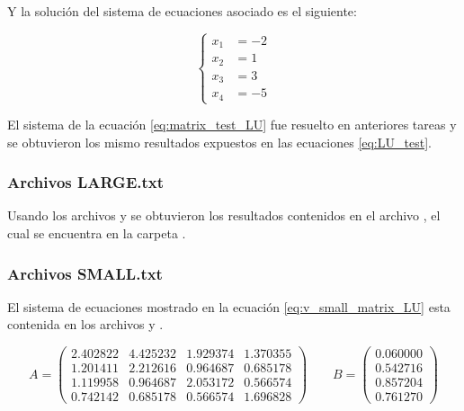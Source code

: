 Y la solución del sistema de ecuaciones asociado es el siguiente:

\begin{equation}
    \begin{cases}
        x_1 & = -2 \\
        x_2 & = 1  \\
        x_3 & = 3  \\
        x_4 & = -5
    \end{cases}
    \label{eq:LU_test}
\end{equation}

El sistema de la ecuación \ref{eq:matrix_test_LU} fue resuelto en anteriores tareas y se obtuvieron los mismo resultados expuestos en las ecuaciones \ref{eq:LU_test}.

\subsubsection{Archivos LARGE.txt}

Usando los archivos  y  se obtuvieron los resultados contenidos en el archivo , el cual se encuentra en la carpeta .

\subsubsection{Archivos SMALL.txt \label{sec:small_lu}}

El sistema de ecuaciones mostrado en la ecuación \ref{eq:v_small_matrix_LU} esta contenida en los archivos  y .

\begin{equation}
    A= \begin{pmatrix}
        2.402822 & 4.425232 & 1.929374 & 1.370355 \\
        1.201411 & 2.212616 & 0.964687 & 0.685178 \\
        1.119958 & 0.964687 & 2.053172 & 0.566574 \\
        0.742142 & 0.685178 & 0.566574 & 1.696828
    \end{pmatrix} \qquad
    B = \begin{pmatrix}
        0.060000 \\
        0.542716 \\
        0.857204 \\
        0.761270
    \end{pmatrix}
    \label{eq:v_small_matrix_LU}
\end{equation}

